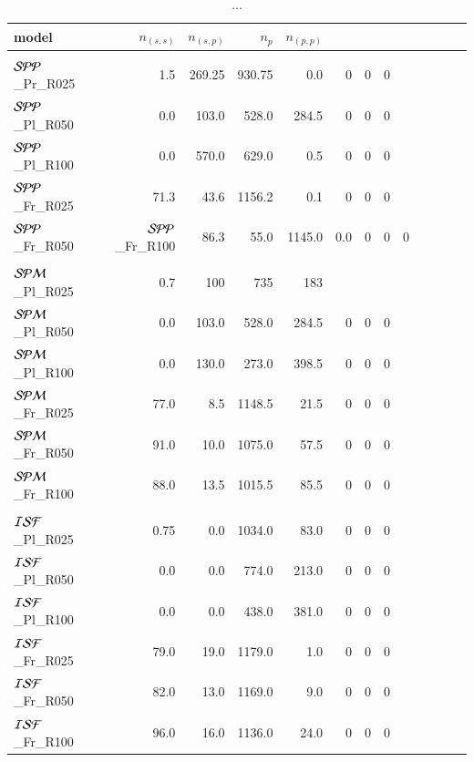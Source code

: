 \documentclass[aa]{lib/aa}
\begin{document}
\begin{table}
 \caption{...}
 \label{Tab:model_PP}
 \centering 
 \begin{tabular}{lrrrrrrrrrrrr}
   \hline\hline
   model & $n_{(s,s)}$ & $n_{(s,p)}$ & $n_{p}$ & $n_{(p,p)}$ \\
        \hline \vspace{-0.75em}\\
${\cal SPP}$\_Pr\_R025 &  1.5 & 269.25 & 930.75 & 0.0 & 0 & 0 & 0 \\%
${\cal SPP}$\_Pl\_R050 &  0.0 & 103.0 & 528.0 & 284.5 & 0 & 0 & 0 \\%
${\cal SPP}$\_Pl\_R100 &  0.0 & 570.0 & 629.0 & 0.5 & 0 & 0 & 0 \\%
${\cal SPP}$\_Fr\_R025 &  71.3 & 43.6 & 1156.2 & 0.1 & 0 & 0 & 0 \\%
${\cal SPP}$\_Fr\_R050 & 
${\cal SPP}$\_Fr\_R100 &  86.3 & 55.0 & 1145.0 & 0.0 & 0 & 0 & 0 \\%

 \hline
  \hline \vspace{-0.75em}\\
${\cal SPM}$\_Pl\_R025 & 0.7  & 100  & 735 & 183 \\ %
${\cal SPM}$\_Pl\_R050 & 0.0 & 103.0 & 528.0 & 284.5 & 0 & 0 & 0 \\ %
${\cal SPM}$\_Pl\_R100 & 0.0 & 130.0 & 273.0 & 398.5 & 0 & 0 & 0 \\ %
${\cal SPM}$\_Fr\_R025 & 77.0 & 8.5 & 1148.5 & 21.5 & 0 & 0 & 0 \\%
${\cal SPM}$\_Fr\_R050 & 91.0 & 10.0 & 1075.0 & 57.5 & 0 & 0 & 0 \\%
${\cal SPM}$\_Fr\_R100 & 88.0 & 13.5 & 1015.5 & 85.5 & 0 & 0 & 0 \\%

  \hline
  \hline \vspace{-0.75em}\\
${\cal ISF}$\_Pl\_R025 & 0.75 & 0.0 & 1034.0 & 83.0 & 0 & 0 & 0 \\ %
${\cal ISF}$\_Pl\_R050 &  0.0 & 0.0 & 774.0 & 213.0 & 0 & 0 & 0 \\ %
${\cal ISF}$\_Pl\_R100 &  0.0 & 0.0 & 438.0 & 381.0 & 0 & 0 & 0 \\ %
${\cal ISF}$\_Fr\_R025 & 79.0 & 19.0 & 1179.0 & 1.0 & 0 & 0 & 0 \\ %
${\cal ISF}$\_Fr\_R050 &  82.0 & 13.0 & 1169.0 & 9.0 & 0 & 0 & 0 \\ %
${\cal ISF}$\_Fr\_R100 &  96.0 & 16.0 & 1136.0 & 24.0 & 0 & 0 & 0 \\ %


\end{tabular}
\end{table}
\end{document}
